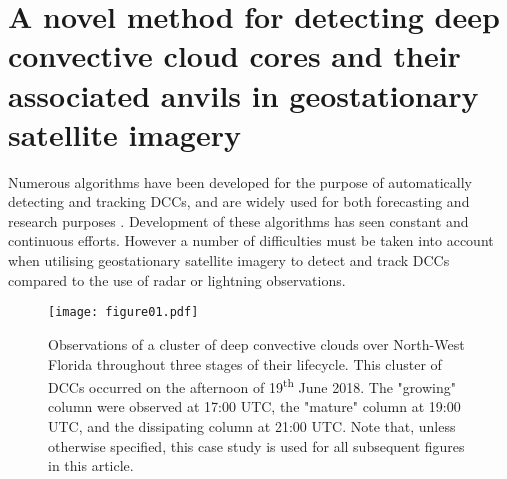 \section{A novel method for detecting deep convective cloud cores and their associated anvils in geostationary satellite imagery}

Numerous algorithms have been developed for the purpose of automatically detecting and tracking DCCs, and are widely used for both forecasting and research purposes \citep[e.g.][]{mecikalski_use_2011, senf_characterization_2015, senf_satellite-based_2017, feng_life_2012, feng_spatiotemporal_2019, zinner_cb-tram:_2008}.
Development of these algorithms has seen constant and continuous efforts.
However a number of difficulties must be taken into account when utilising geostationary satellite imagery to detect and track DCCs compared to the use of radar or lightning observations.

\begin{figure*}[t]
    \centering
    \texttt{[image: figure01.pdf]}
    \caption{Observations of a cluster of deep convective clouds over North-West Florida throughout three stages of their lifecycle. This cluster of DCCs occurred on the afternoon of 19\textsuperscript{th} June 2018. The "growing" column were observed at 17:00 UTC, the "mature" column at 19:00 UTC, and the dissipating column at 21:00 UTC. Note that, unless otherwise specified, this case study is used for all subsequent figures in this article.}
    \label{fig:compare_sat_radar_glm}
\end{figure*}

